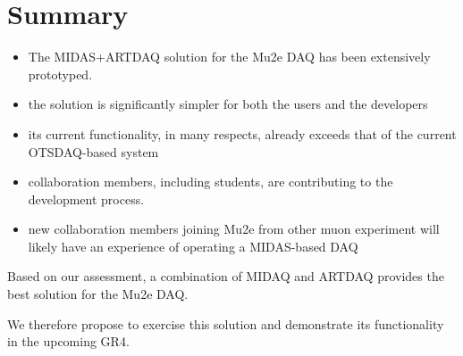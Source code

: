 \section {Summary}

\begin{itemize}
\item 
  The MIDAS+ARTDAQ solution for the Mu2e DAQ has been extensively prototyped.
\item
  the solution is significantly simpler for both the users and the developers
\item
  its current functionality, in many respects, already exceeds that
  of the current OTSDAQ-based system  
\item
  collaboration members, including students, are contributing
  to the development process. 
\item
  new collaboration members joining Mu2e from other muon experiment will
  likely have an experience of operating a MIDAS-based DAQ
\end{itemize}

Based on our assessment, a combination of MIDAQ and  ARTDAQ
provides the best solution for the Mu2e DAQ.

We therefore propose to exercise this solution and demonstrate
its functionality in the upcoming GR4.


